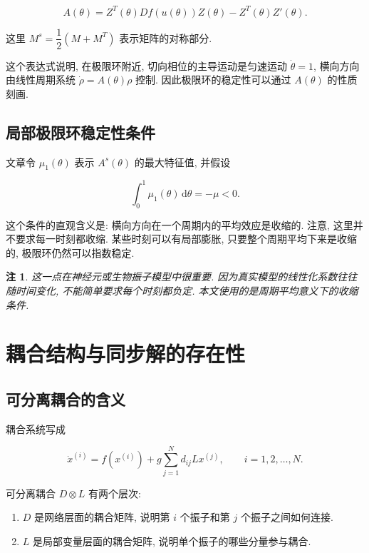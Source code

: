 \documentclass[oneside]{ctexart}
\newtheorem{remark}{注}[section]
\newcommand{\dd}{\mathrm{d}}
\begin{document}
\begin{equation}
    A(\theta)=Z^T(\theta)Df(u(\theta))Z(\theta)-Z^T(\theta)Z'(\theta).
\end{equation}

这里 $M^s=\dfrac{1}{2}(M+M^T)$ 表示矩阵的对称部分.

这个表达式说明, 在极限环附近, 切向相位的主导运动是匀速运动 $\dot{\theta}=1$, 横向方向由线性周期系统 $\dot{\rho}=A(\theta)\rho$ 控制. 因此极限环的稳定性可以通过 $A(\theta)$ 的性质刻画.

\subsection{局部极限环稳定性条件}

文章令 $\mu_1(\theta)$ 表示 $A^s(\theta)$ 的最大特征值, 并假设

\begin{equation}
    \int_0^1 \mu_1(\theta)\,\dd \theta=-\mu<0.
\end{equation}

这个条件的直观含义是: 横向方向在一个周期内的平均效应是收缩的. 注意, 这里并不要求每一时刻都收缩. 某些时刻可以有局部膨胀, 只要整个周期平均下来是收缩的, 极限环仍然可以指数稳定.

\begin{remark}
    这一点在神经元或生物振子模型中很重要. 因为真实模型的线性化系数往往随时间变化, 不能简单要求每个时刻都负定. 本文使用的是周期平均意义下的收缩条件.
\end{remark}

\section{耦合结构与同步解的存在性}

\subsection{可分离耦合的含义}

耦合系统写成

\begin{equation}
    \dot{x}^{(i)}=f(x^{(i)})+g\sum_{j=1}^N d_{ij}Lx^{(j)},
    \qquad i=1,2,\dots,N.
\end{equation}

可分离耦合 $D\otimes L$ 有两个层次:

\begin{enumerate}[(1)]
    \item $D$ 是网络层面的耦合矩阵, 说明第 $i$ 个振子和第 $j$ 个振子之间如何连接.
    \item $L$ 是局部变量层面的耦合矩阵, 说明单个振子的哪些分量参与耦合.
\end{enumerate}
\end{document}
